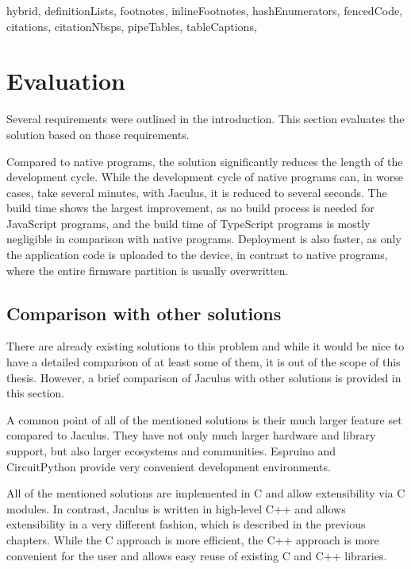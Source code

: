 \begin{markdown*}{%
  hybrid,
  definitionLists,
  footnotes,
  inlineFootnotes,
  hashEnumerators,
  fencedCode,
  citations,
  citationNbsps,
  pipeTables,
  tableCaptions,
}


\chapter{Evaluation}

Several requirements were outlined in the introduction. This section evaluates the solution based on those requirements.

Compared to native programs, the solution significantly reduces the length of the development cycle. While the development cycle of native programs can, in worse cases, take several minutes, with Jaculus, it is reduced to several seconds. The build time shows the largest improvement, as no build process is needed for JavaScript programs, and the build time of TypeScript programs is mostly negligible in comparison with native programs. Deployment is also faster, as only the application code is uploaded to the device, in contrast to native programs, where the entire firmware partition is usually overwritten.

\section{Comparison with other solutions}

There are already existing solutions to this problem and while it would be nice to have a detailed comparison of at least some of them, it is out of the scope of this thesis. However, a brief comparison of Jaculus with other solutions is provided in this section.

A common point of all of the mentioned solutions is their much larger feature set compared to Jaculus. They have not only much larger hardware and library support, but also larger ecosystems and communities. Espruino and CircuitPython provide very convenient development environments.

All of the mentioned solutions are implemented in C and allow extensibility via C modules. In contrast, Jaculus is written in high-level C++ and allows extensibility in a very different fashion, which is described in the previous chapters. While the C approach is more efficient, the C++ approach is more convenient for the user and allows easy reuse of existing C and C++ libraries.


\end{markdown*}
